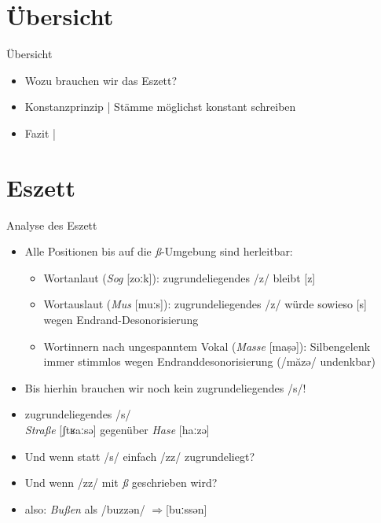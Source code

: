 \section{Übersicht}

\begin{frame}
  {Übersicht}
  \onslide<+->
  \begin{itemize}[<+->]
    \item Wozu brauchen wir das \alert{Eszett}?
      \Zeile
    \item \alert{Konstanzprinzip} | Stämme möglichst konstant schreiben
      \Zeile
    \item Fazit | 
  \end{itemize}
\end{frame}


\section{Eszett}

\newcommand{\phopro}{\ensuremath{\Rightarrow}}

\begin{frame}
  {Analyse des Eszett}
  \pause
  \begin{itemize}[<+->]
    \item \alert{Alle Positionen bis auf die \textit{ß}-Umgebung sind herleitbar:}
      \begin{itemize}[<+->]
        \item Wortanlaut (\textit{Sog} [zoːk]): zugrundeliegendes /z/ bleibt [z]
        \item Wortauslaut (\textit{Mus} [muːs]): zugrundeliegendes /z/ würde sowieso [s]\\
          wegen Endrand-Desonorisierung
        \item Wortinnern nach ungespanntem Vokal (\textit{Masse} [maṣə]): \alert{Silbengelenk}\\
          immer stimmlos wegen Endranddesonorisierung (/măzə/ undenkbar)
      \end{itemize}
      \Halbzeile
    \item \alert{Bis hierhin brauchen wir noch kein zugrundeliegendes /s/!}
      \Halbzeile
    \item zugrundeliegendes /s/ \\
      \textit{Straße} [ʃtʁaːsə] gegenüber \textit{Hase} [haːzə]
    \item \alert{Und wenn statt /s/ einfach /zz/ zugrundeliegt?}
    \item \alert{Und wenn /zz/ mit \textit{ß} geschrieben wird?}
    \item also: \textit{Bußen} als /buzzən/ \phopro [buːssən]
  \end{itemize}
\end{frame}

